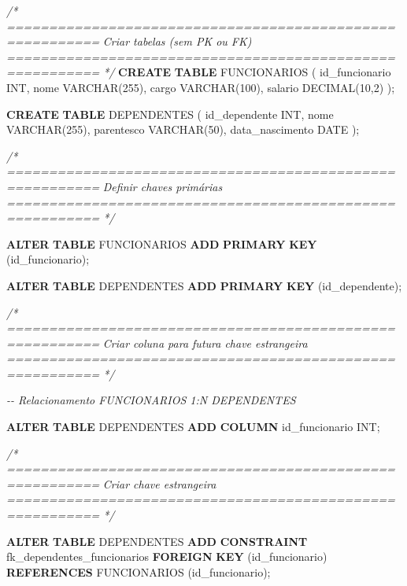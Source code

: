 \documentclass[
]{book}
\newenvironment{Shaded}{\begin{snugshade}}{\end{snugshade}}
\newcommand{\CommentTok}[1]{\textcolor[rgb]{0.56,0.35,0.01}{\textit{#1}}}
\newcommand{\DataTypeTok}[1]{\textcolor[rgb]{0.13,0.29,0.53}{#1}}
\newcommand{\DecValTok}[1]{\textcolor[rgb]{0.00,0.00,0.81}{#1}}
\newcommand{\KeywordTok}[1]{\textcolor[rgb]{0.13,0.29,0.53}{\textbf{#1}}}
\newcommand{\NormalTok}[1]{#1}
\begin{document}
\begin{Shaded}
\begin{Highlighting}[]
\CommentTok{/* =========================================================}
\CommentTok{   Criar tabelas (sem PK ou FK)}
\CommentTok{   ========================================================= */}
\KeywordTok{CREATE} \KeywordTok{TABLE}\NormalTok{ FUNCIONARIOS }
\NormalTok{(}
\NormalTok{    id\_funcionario }\DataTypeTok{INT}\NormalTok{,}
\NormalTok{    nome }\DataTypeTok{VARCHAR}\NormalTok{(}\DecValTok{255}\NormalTok{),}
\NormalTok{    cargo }\DataTypeTok{VARCHAR}\NormalTok{(}\DecValTok{100}\NormalTok{),}
\NormalTok{    salario }\DataTypeTok{DECIMAL}\NormalTok{(}\DecValTok{10}\NormalTok{,}\DecValTok{2}\NormalTok{)}
\NormalTok{);}

\KeywordTok{CREATE} \KeywordTok{TABLE}\NormalTok{ DEPENDENTES }
\NormalTok{(}
\NormalTok{    id\_dependente }\DataTypeTok{INT}\NormalTok{,}
\NormalTok{    nome }\DataTypeTok{VARCHAR}\NormalTok{(}\DecValTok{255}\NormalTok{),}
\NormalTok{    parentesco }\DataTypeTok{VARCHAR}\NormalTok{(}\DecValTok{50}\NormalTok{),}
\NormalTok{    data\_nascimento }\DataTypeTok{DATE}
\NormalTok{);}

\CommentTok{/* =========================================================}
\CommentTok{   Definir chaves primárias}
\CommentTok{   ========================================================= */}

\KeywordTok{ALTER} \KeywordTok{TABLE}\NormalTok{ FUNCIONARIOS }\KeywordTok{ADD} \KeywordTok{PRIMARY} \KeywordTok{KEY}\NormalTok{ (id\_funcionario);}

\KeywordTok{ALTER} \KeywordTok{TABLE}\NormalTok{ DEPENDENTES }\KeywordTok{ADD} \KeywordTok{PRIMARY} \KeywordTok{KEY}\NormalTok{ (id\_dependente);}

\CommentTok{/* =========================================================}
\CommentTok{   Criar coluna para futura chave estrangeira}
\CommentTok{   ========================================================= */}

\CommentTok{{-}{-} Relacionamento FUNCIONARIOS 1:N DEPENDENTES}

\KeywordTok{ALTER} \KeywordTok{TABLE}\NormalTok{ DEPENDENTES }\KeywordTok{ADD} \KeywordTok{COLUMN}\NormalTok{ id\_funcionario }\DataTypeTok{INT}\NormalTok{;}

\CommentTok{/* =========================================================}
\CommentTok{   Criar chave estrangeira}
\CommentTok{   ========================================================= */}

\KeywordTok{ALTER} \KeywordTok{TABLE}\NormalTok{ DEPENDENTES }\KeywordTok{ADD} \KeywordTok{CONSTRAINT}\NormalTok{ fk\_dependentes\_funcionarios }\KeywordTok{FOREIGN} \KeywordTok{KEY}\NormalTok{ (id\_funcionario) }\KeywordTok{REFERENCES}\NormalTok{ FUNCIONARIOS  (id\_funcionario);}

\end{Highlighting}
\end{Shaded}
\end{document}
